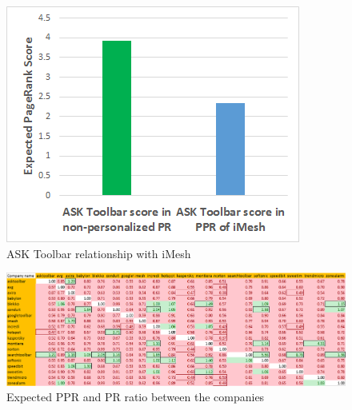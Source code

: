 \documentclass[ijoc,nonblindrev]{informs3} %
\numberwithin{equation}{subsection}
\begin{document}

\begin{figure}[!htbp]
\centering
\includegraphics[scale=0.8]{figures/ask_clash_imesh.png}
\caption{ASK Toolbar relationship with iMesh}
\label{fig:ask_clash_imesh}
\end{figure}

\begin{figure}
    \includegraphics[scale=0.8]{figures/RatioMatrix.png}
    \caption{Expected PPR and PR ratio between the companies}
    \label{fig:RatioMatrix}
\end{figure}
\end{document}

